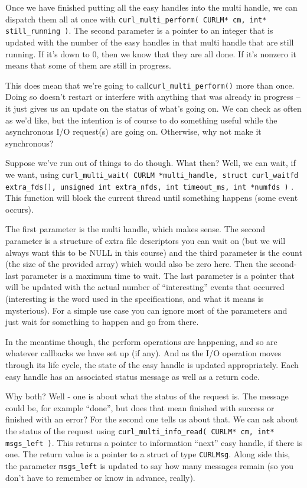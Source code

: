 \documentclass[a4paper]{report}
\begin{document}
Once we have finished putting all the easy handles into the multi handle, we can dispatch them all at once with \texttt{curl\_multi\_perform( CURLM* cm, int* still\_running )}. The second parameter is a pointer to an integer that is updated with the number of the easy handles in that multi handle that are still running. If it's down to 0, then we know that they are all done. If it's nonzero it means that some of them are still in progress.

This does mean that we're going to call\texttt{curl\_multi\_perform()} more than once. Doing so doesn't restart or interfere with anything that was already in progress -- it just gives us an update on the status of what's going on. We can check as often as we'd like, but the intention is of course to do something useful while the asynchronous I/O request(s) are going on. Otherwise, why not make it synchronous?

Suppose we've run out of things to do though. What then? Well, we can wait, if we want, using \texttt{curl\_multi\_wait( CURLM *multi\_handle, struct curl\_waitfd extra\_fds[], unsigned int extra\_nfds, int timeout\_ms, int *numfds )} . This function will block the current thread until something happens (some event occurs).

The first parameter is the multi handle, which makes sense. The second parameter is a structure of extra file descriptors you can wait on (but we will always want this to be NULL in this course) and the third parameter is the count (the size of the provided array) which would also be zero here. Then the second-last parameter is a maximum time to wait. The last parameter is a pointer that will be updated with the actual number of ``interesting'' events that occurred (interesting is the word used in the specifications, and what it means is mysterious). For a simple use case you can ignore most of the parameters and just wait for something to happen and go from there.

In the meantime though, the perform operations are happening, and so are whatever callbacks we have set up (if any). And as the I/O operation moves through its life cycle, the state of the easy handle is updated appropriately. Each easy handle has an associated status message as well as a return code.

Why both? Well - one is about what the status of the request is. The message could be, for example ``done'', but does that mean finished with success or finished with an error? For the second one tells us about that. We can ask about the status of the request using \texttt{curl\_multi\_info\_read( CURLM* cm, int* msgs\_left )}. This returns a pointer to information ``next'' easy handle, if there is one. The return value is a pointer to a struct of type \texttt{CURLMsg}. Along side this, the parameter \texttt{msgs\_left} is updated to say how many messages remain (so you don't have to remember or know in advance, really). 
\end{document}
